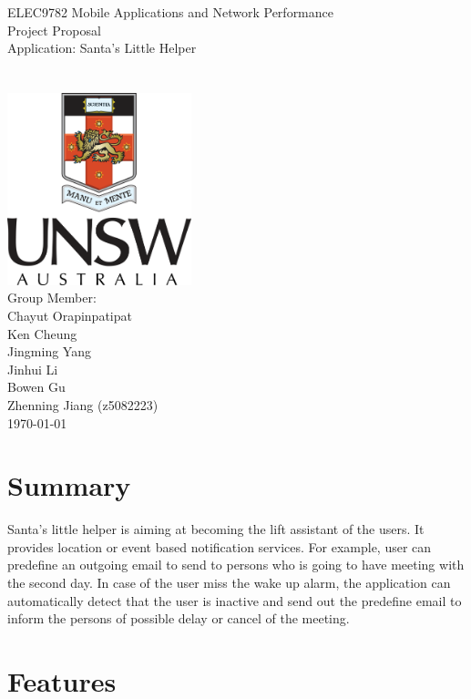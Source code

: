 \documentclass[a4paper,12pt]{article}
\author{Zhenning Jiang (z5082223)}
\date{\today}
\begin{document}
	\begin{titlepage}
		\begin{center}
			\Huge{
				ELEC9782 Mobile Applications and Network Performance\\
			}
			\Huge{
				Project Proposal\\
				[1cm]
				Application: Santa's Little Helper\\
			}
			\\[2cm]\\
			
			\includegraphics[width = 0.4\textwidth]{UNSW_coat_of_arms.png}\\
			[1.5cm]
			\Large{Group Member: \\
				Chayut Orapinpatipat\\
				Ken Cheung \\
				Jingming Yang\\
				Jinhui Li\\
				Bowen Gu\\
				Zhenning Jiang (z5082223)\\
				[0.7cm]
				\today\\
				[0.7cm]
			}		
		\end{center}
	\end{titlepage}
    \newpage
	
	\section{Summary}
	Santa's little helper is aiming at becoming the lift assistant of the users. It provides location or event based notification services. For example, user can predefine an outgoing email to send to persons who is going to have meeting with the second day. In case of the user miss the wake up alarm, the application can automatically detect that the user is inactive and send out the predefine email to inform the persons of possible delay or cancel of the meeting.
	
	
	
	\section{Features}
	
	
\end{document}
